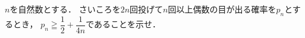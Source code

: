 \documentclass[../../main.tex]{subfiles}
\begin{document}
$n$を自然数とする．
さいころを$2n$回投げて$n$回以上偶数の目が出る確率を$p_n$とするとき，
$\displaystyle p_n\geqq\dfrac{1}{2}+\dfrac{1}{4n}$であることを示せ．
\end{document}
